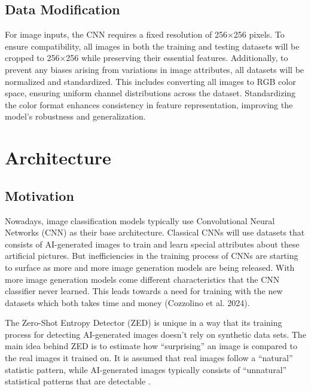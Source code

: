 \documentclass{article} %
\begin{document}
\subsection{Data Modification}
\label{data_mod}
For image inputs, the CNN requires a fixed resolution of 256×256 pixels. To ensure compatibility, all images in both the training and testing datasets will be cropped to 256×256 while preserving their essential features.
Additionally, to prevent any biases arising from variations in image attributes, all datasets will be normalized and standardized. This includes converting all images to RGB color space, ensuring uniform channel distributions across the dataset. Standardizing the color format enhances consistency in feature representation, improving the model's robustness and generalization.

\section{Architecture}
\label{arch}
\subsection{Motivation}

Nowadays, image classification models typically use Convolutional Neural Networks (CNN) as their base architecture. Classical CNNs will use datasets that consists of AI-generated images to train and learn special attributes about these artificial pictures. But inefficiencies in the training process of CNNs are starting to surface as more and more image generation models are being released. With more image generation models come different characteristics that the CNN classifier never learned. This leads towards a need for training with the new datasets which both takes time and money (Cozzolino et al. 2024).


The Zero-Shot Entropy Detector (ZED) is unique in a way that its training process for detecting AI-generated images doesn't rely on synthetic data sets. The main idea behind ZED is to estimate how ``surprising'' an image is compared to the real images it trained on. It is assumed that real images follow a ``natural'' statistic pattern, while AI-generated images typically consists of ``unnatural'' statistical patterns that are detectable \citep{cozzolino2024zeroshotdetectionaigeneratedimages}.
\end{document}

